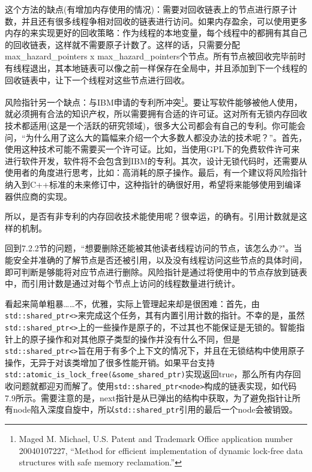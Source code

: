 这个方法的缺点(有增加内存使用的情况)：需要对回收链表上的节点进行原子计数，并且还有很多线程争相对回收的链表进行访问。如果内存盈余，可以使用更多内存的来实现更好的回收策略：作为线程的本地变量，每个线程中的都拥有其自己的回收链表，这样就不需要原子计数了。这样的话，只需要分配max\_hazard\_pointers x max\_hazard\_pointers个节点。所有节点被回收完毕前时有线程退出，其本地链表可以像之前一样保存在全局中，并且添加到下一个线程的回收链表中，让下一个线程对这些节点进行回收。

风险指针另一个缺点：与IBM申请的专利所冲突\footnote[2]{Maged M. Michael, U.S. Patent and Trademark Office application number 20040107227, “Method for efficient implementation of dynamic lock-free data structures with safe memory reclamation.”}。要让写软件能够被他人使用，就必须拥有合法的知识产权，所以需要拥有合适的许可证。这对所有无锁内存回收技术都适用(这是一个活跃的研究领域)，很多大公司都会有自己的专利。你可能会问，“为什么用了这么大的篇幅来介绍一个大多数人都没办法的技术呢？”。首先，使用这种技术可能不需要买一个许可证。比如，当使用GPL下的免费软件许可来进行软件开发，软件将不会包含到IBM的专利。其次，设计无锁代码时，还需要从使用者的角度进行思考，比如：高消耗的原子操作。最后，有一个建议将风险指针纳入到C++标准的未来修订中，这种指针的确很好用，希望将来能够使用到编译器供应商的实现。

所以，是否有非专利的内存回收技术能使用呢？很幸运，的确有。引用计数就是这样的机制。


回到7.2.2节的问题，“想要删除还能被其他读者线程访问的节点，该怎么办?"。当能安全并准确的了解节点是否还被引用，以及没有线程访问这些节点的具体时间，即可判断是够能将对应节点进行删除。风险指针是通过将使用中的节点存放到链表中，而引用计数是通过对每个节点上访问的线程数量进行统计。

看起来简单粗暴……不，优雅，实际上管理起来却是很困难：首先，由\texttt{std::shared\_ptr<>}来完成这个任务，其有内置引用计数的指针。不幸的是，虽然\texttt{std::shared\_ptr<>}上的一些操作是原子的，不过其也不能保证是无锁的。智能指针上的原子操作和对其他原子类型的操作并没有什么不同，但是\texttt{std::shared\_ptr<>}旨在用于有多个上下文的情况下，并且在无锁结构中使用原子操作，无异于对该类增加了很多性能开销。如果平台支持\texttt{std::atomic\_is\_lock\_free(\&some\_shared\_ptr)}实现返回true，那么所有内存回收问题就都迎刃而解了。使用\texttt{std::shared\_ptr<node>}构成的链表实现，如代码7.9所示。需要注意的是，next指针是从已弹出的结构中获取，为了避免指针让所有node陷入深度自旋中，所以\texttt{std::shared\_ptr}引用的最后一个node会被销毁。

